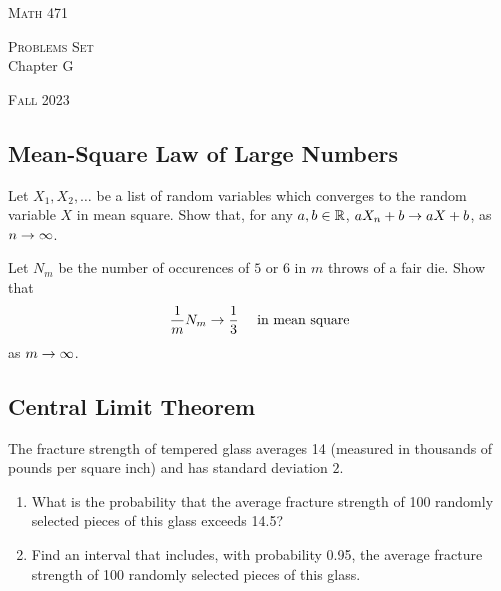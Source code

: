 


\hrulefill

\begin{minipage}{0.33\textwidth}
\textsc{Math 471}
\end{minipage} \hfill 
\begin{minipage}{0.32\textwidth}
\centering
\textsc{Problems Set} \\
Chapter G
\end{minipage}
 \hfill 
 \begin{minipage}{0.33\textwidth}
 \flushright \textsc{Fall 2023}
 \end{minipage}

\hrulefill

\setcounter{section}{7}

\subsection{Mean-Square Law of Large Numbers}

\begin{problem}
Let $X_1, X_2, \ldots$ be a list of random variables which converges to the random variable $X$ in mean square. Show that, for any $a, b \in \mathbb{R}$, $aX_n + b \rightarrow aX + b$, as $n \rightarrow \infty$.
\end{problem}

\begin{problem}
Let $N_m$ be the number of occurences of $5$ or $6$ in $m$ throws of a fair die. Show that
    \[
        \frac{1}{m} N_m \rightarrow \frac{1}{3} \quad \text{ in mean square}
     \] 
as $m \rightarrow \infty$.
\end{problem}

\subsection{Central Limit Theorem}

\begin{problem}
The fracture strength of tempered glass averages 14 (measured in thousands of pounds per square inch) and has standard deviation $2$. 
    \begin{enumerate}[label=\alph*)]
    \item What is the probability that the average fracture strength of 100 randomly selected pieces of this glass exceeds 14.5?
    \item Find an interval that includes, with probability 0.95, the average fracture strength of 100 randomly selected pieces of this glass.
    \end{enumerate}
\end{problem}


